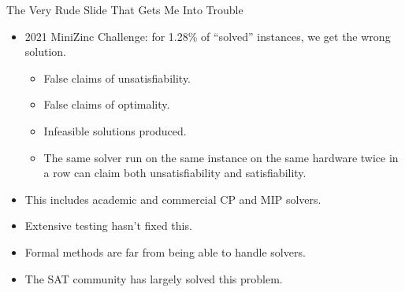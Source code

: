 \documentclass[aspectratio=169,compress,10pt]{beamer}
\begin{document}
\begin{frame}{The Very Rude Slide That Gets Me Into Trouble}
    \begin{itemize}
        \item 2021 MiniZinc Challenge: for 1.28\% of ``solved'' instances, we get the wrong solution.
            \begin{itemize}
                \item False claims of unsatisfiability.
                \item False claims of optimality.
                \item Infeasible solutions produced.
                \item The same solver run on the same instance on the same hardware twice in a row
                    can claim both unsatisfiability and satisfiability.
            \end{itemize}
        \item This includes academic and commercial CP and MIP solvers.
        \item Extensive testing hasn't fixed this.
        \item Formal methods are far from being able to handle solvers.
        \item <2-> The SAT community has largely solved this problem.
    \end{itemize}
\end{frame}
\end{document}
